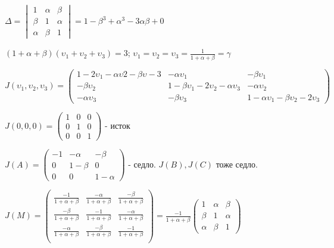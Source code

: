\documentclass{article}
\begin{document}
\vspace{0.5cm}
\(
	\Delta = 
	\begin{vmatrix}
	1 & \alpha & \beta \\ 
	\beta & 1 & \alpha \\
	\alpha & \beta & 1
	\end{vmatrix}
	= 1 - \beta^3 + \alpha^3 - 3\alpha\beta + 0
\)

\vspace{0.5cm}
\((1 + \alpha + \beta)(\upsilon_1 + \upsilon_2 + \upsilon_3) = 3 \);\hspace{0.5cm}
\(\upsilon_1 = \upsilon_2 = \upsilon_3 = \frac{1}{1 + \alpha + \beta} = \gamma \)

\vspace{0.5cm}
\(
J (\upsilon_1,\upsilon_2,\upsilon_3) = 
	\begin{pmatrix}
		1 - 2\upsilon_1 - \alpha\upsilon2 - \beta\upsilon-3 & -\alpha\upsilon_1 & -\beta\upsilon_1 \\
		-\beta\upsilon_2 & 1 - \beta\upsilon_1 - 2\upsilon_2 - \alpha\upsilon_3 & -\alpha\upsilon_2\\
		-\alpha\upsilon_3 & -\beta\upsilon_3 & 1 - \alpha\upsilon_1 - \beta\upsilon_2 - 2\upsilon_3
	\end{pmatrix}
\)

\vspace{0.5cm}
\(
J(0,0,0) = 
	\begin{pmatrix}
		1 & 0 & 0\\
		0 & 1 & 0\\
		0 & 0 & 1
	\end{pmatrix}
\)
\hspace{0.2cm} - исток

\vspace{0.5cm}
\(
J(A) = 
	\begin{pmatrix}
	-1 & -\alpha & -\beta \\
	0  & 1-\beta & 0      \\
	0  &   0     & 1-\alpha
	\end{pmatrix}
\)
\hspace{0.2cm} - седло. \(J(B), J(C)\) тоже седло.

\vspace{0.5cm}
\begin{LARGE}
\(
J(M) =
	\begin{pmatrix}
		\frac{-1}{1+\alpha + \beta} & \frac{-\alpha}{1+\alpha+\beta} & \frac{-\beta}{1+\alpha+\beta}\\
		 \frac{-\beta}{1+\alpha+\beta} & \frac{-1}{1+\alpha + \beta} & \frac{-\alpha}{1+\alpha+\beta}\\
		 \frac{-\alpha}{1+\alpha+\beta} & \frac{-\beta}{1+\alpha+\beta} & \frac{-1}{1+\alpha + \beta}\\
	\end{pmatrix}
=\frac{-1}{1+\alpha+\beta}
	\begin{pmatrix}
		1 & \alpha & \beta\\
		\beta & 1 & \alpha\\
		\alpha & \beta & 1
	\end{pmatrix}
\)
\end{LARGE}
\end{document}
